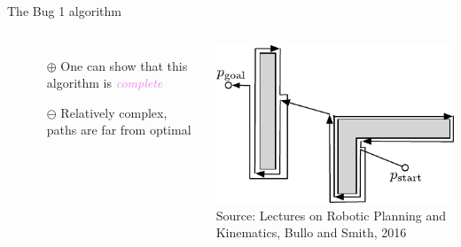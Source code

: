 \documentclass[aspectratio=169]{beamer}
\begin{document}
%	
%	

\appendix

\backupbegin
\begin{frame}{The Bug 1 algorithm}
\begin{columns}
	\begin{minipage}{\textwidth}\begin{algorithmic}[1]
			\State{\textcolor{violet}{at the same time}}
			\EndIf
			\EndWhile
	\end{algorithmic}\end{minipage}
	\vspace{0.5cm}
	\begin{itemize}
		\item[\color{chameleon3}$\oplus$] One can show that this algorithm is \emph{\textcolor{violet}{complete}}
		\item[$\ominus$] Relatively complex, paths are far from optimal
	\end{itemize}
	\includegraphics[width=\textwidth]{media/bug_1_sketch.pdf}\\
	\footnotesize\textcolor{aluminium4}{Source: Lectures on Robotic Planning and Kinematics, Bullo and Smith, 2016}
\end{columns}
\end{frame}
\end{document}
